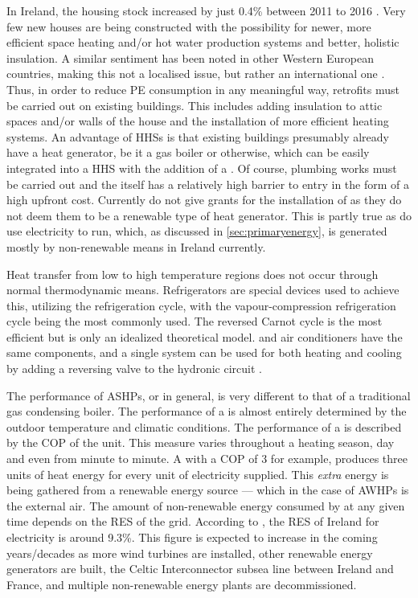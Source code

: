 In Ireland, the housing stock increased by just 0.4\% between 2011 to 2016 \cite{cso_2020}. Very few new houses are being constructed with the possibility for newer, more efficient space heating and/or hot water production systems and better, holistic insulation. A similar sentiment has been noted in other Western European countries, making this not a localised issue, but rather an international one \cite{klein_numerical_2014, dongellini_influence_2021}. Thus, in order to reduce \ac{PE} consumption in any meaningful way, retrofits must be carried out on existing buildings. This includes adding insulation to attic spaces and/or walls of the house and the installation of more efficient heating systems. An advantage of \acp{HHS} is that existing buildings presumably already have a heat generator, be it a gas boiler or otherwise, which can be easily integrated into a \ac{HHS} with the addition of a \HP. Of course, plumbing works must be carried out and the \HP itself has a relatively high barrier to entry in the form of a high upfront cost. Currently  do not give grants for the installation of \HPs as they do not deem them to be a renewable type of heat generator. This is partly true as \HPs do use electricity to run, which, as discussed in \cref{sec:primaryenergy}, is generated mostly by non-renewable means in Ireland currently.  

Heat transfer from low to high temperature regions does not occur through normal thermodynamic means. Refrigerators are special devices used to achieve this, utilizing the refrigeration cycle, with the vapour-compression refrigeration cycle being the most commonly used. The reversed Carnot cycle is the most efficient but is only an idealized theoretical model. \HPs and air conditioners have the same components, and a single system can be used for both heating and cooling by adding a reversing valve to the hydronic circuit \cite{cengel_thermo_2020}.

The performance of \acp{ASHP}, or \HPs in general, is very different to that of a traditional gas condensing boiler. The performance of a \HP is almost entirely determined by the outdoor temperature and climatic conditions. The performance of a \HP is described by the \ac{COP} of the unit. This measure varies throughout a heating season, day and even from minute to minute. A \HP with a \ac{COP} of 3 for example, produces three units of heat energy for every unit of electricity supplied. This \textit{extra} energy is being gathered from a renewable energy source --- which in the case of \acp{AWHP} is the external air. The amount of non-renewable energy consumed by \HP at any given time depends on the \ac{RES} of the grid. According to , the \ac{RES} of Ireland for electricity is around 9.3\%. This figure is expected to increase in the coming years/decades as more wind turbines are installed, other renewable energy generators are built, the Celtic Interconnector subsea line between Ireland and France, and multiple non-renewable energy plants are decommissioned.


